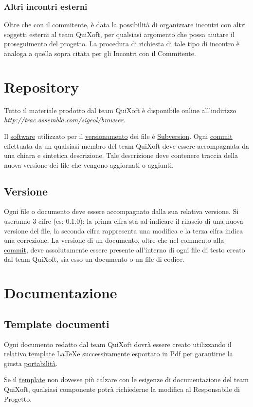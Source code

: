 \documentclass[11pt,a4paper]{article}
\begin{document}
\subsubsection{Altri incontri esterni}
Oltre che con il commitente, è data la possibilità di organizzare incontri con altri soggetti esterni al team QuiXoft, per qualsiasi argomento che possa aiutare il proseguimento del progetto.
La procedura di richiesta di tale tipo di incontro è analoga a quella sopra citata per gli Incontri con il Commitente.
\section{Repository}
Tutto il materiale prodotto dal team QuiXoft è disponibile online all'indirizzo \textit{http://trac.assembla.com/sigeol/browser}.

Il \underline{software} utilizzato per il \underline{versionamento} dei file è \underline{Subversion}.
O\-gni \underline{commit} effettuata da un qualsiasi membro del team QuiXoft deve essere accompagnata da una chiara e sintetica descrizione. Tale descrizione deve contenere traccia della nuova versione dei file che vengono aggiornati o aggiunti.
\subsection{Versione}
Ogni file o documento deve essere accompagnato dalla sua relativa versione. Si useranno 3 cifre (es: 0.1.0): la prima cifra sta ad indicare il rilascio di una nuova versione del file, la seconda cifra rappresenta una modifica e la terza cifra indica una correzione. La versione di un documento, oltre che nel commento alla \underline{commit}, deve assolutamente essere presente all'interno di ogni file di testo creato dal team QuiXoft, sia esso un documento o un file di codice.
\section{Documentazione}
\subsection{Template documenti}
Ogni documento redatto dal team QuiXoft dovrà essere creato utilizzando il relativo \underline{template} \LaTeX \space e successivamente esportato in \underline{Pdf} per garantirne la giusta \underline{portabilità}.

Se il \underline{template} non dovesse più calzare con le esigenze di documentazione del team QuiXoft, qualsiasi componente potrà richiederne la modifica al Responsabile di Progetto.
\end{document}
